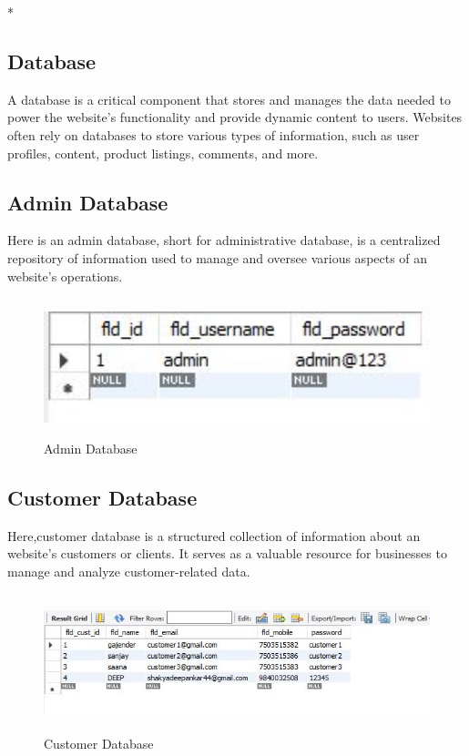 *\subsection*{Database}
A database is a critical component that stores and manages the data needed to power the website's functionality and provide dynamic content to users. Websites often rely on databases to store various types of information, such as user profiles, content, product listings, comments, and more.

\subsection{Admin Database}
Here is an admin database, short for administrative database, is a centralized repository of information used to manage and oversee various aspects of an website's operations.
\begin{figure}[h]
    \centering
    \includegraphics[height=4cm]{img/Graphics/adminDB.JPG}
    \caption{Admin Database}
\end{figure}

\subsection{Customer Database}
Here,customer database is a structured collection of information about an website's customers or clients. It serves as a valuable resource for businesses to manage and analyze customer-related data.
\begin{figure}[h]
    \centering
    \includegraphics[height=4cm]{img/Graphics/costumerDB.JPG}
    \caption{Customer Database}
\end{figure}

